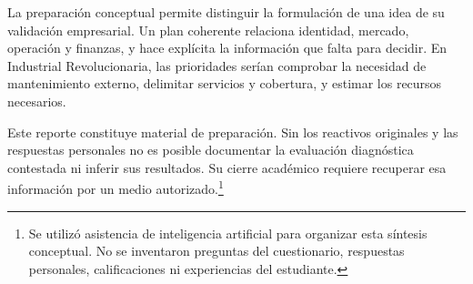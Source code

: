 {La preparación conceptual permite distinguir la formulación de una idea de su validación empresarial. Un plan coherente relaciona identidad, mercado, operación y finanzas, y hace explícita la información que falta para decidir. En Industrial Revolucionaria, las prioridades serían comprobar la necesidad de mantenimiento externo, delimitar servicios y cobertura, y estimar los recursos necesarios.

Este reporte constituye material de preparación. Sin los reactivos originales y las respuestas personales no es posible documentar la evaluación diagnóstica contestada ni inferir sus resultados. Su cierre académico requiere recuperar esa información por un medio autorizado.\footnote{Se utilizó asistencia de inteligencia artificial para organizar esta síntesis conceptual. No se inventaron preguntas del cuestionario, respuestas personales, calificaciones ni experiencias del estudiante.}
}

